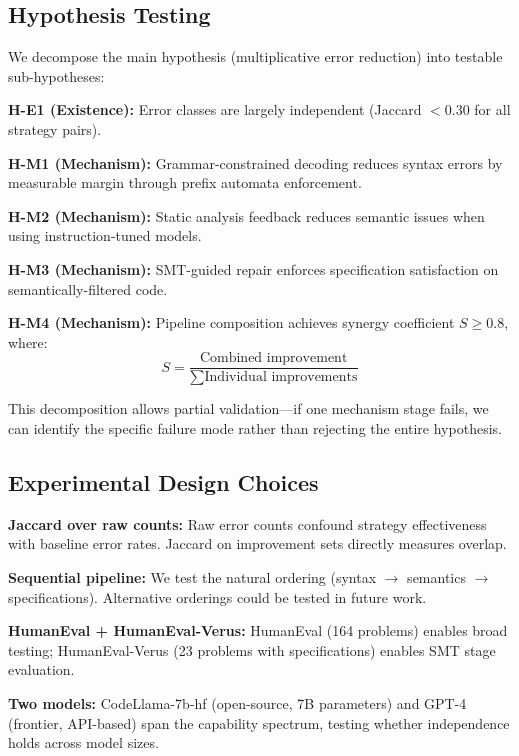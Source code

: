 \subsection{Hypothesis Testing}

We decompose the main hypothesis (multiplicative error reduction) into testable sub-hypotheses:

\textbf{H-E1 (Existence):} Error classes are largely independent (Jaccard $< 0.30$ for all strategy pairs).

\textbf{H-M1 (Mechanism):} Grammar-constrained decoding reduces syntax errors by measurable margin through prefix automata enforcement.

\textbf{H-M2 (Mechanism):} Static analysis feedback reduces semantic issues when using instruction-tuned models.

\textbf{H-M3 (Mechanism):} SMT-guided repair enforces specification satisfaction on semantically-filtered code.

\textbf{H-M4 (Mechanism):} Pipeline composition achieves synergy coefficient $S \geq 0.8$, where:
\begin{equation}
S = \frac{\text{Combined improvement}}{\sum \text{Individual improvements}}
\end{equation}

This decomposition allows partial validation---if one mechanism stage fails, we can identify the specific failure mode rather than rejecting the entire hypothesis.

\subsection{Experimental Design Choices}

\textbf{Jaccard over raw counts:} Raw error counts confound strategy effectiveness with baseline error rates. Jaccard on improvement sets directly measures overlap.

\textbf{Sequential pipeline:} We test the natural ordering (syntax $\rightarrow$ semantics $\rightarrow$ specifications). Alternative orderings could be tested in future work.

\textbf{HumanEval + HumanEval-Verus:} HumanEval (164 problems) enables broad testing; HumanEval-Verus (23 problems with specifications) enables SMT stage evaluation.

\textbf{Two models:} CodeLlama-7b-hf (open-source, 7B parameters) and GPT-4 (frontier, API-based) span the capability spectrum, testing whether independence holds across model sizes.

